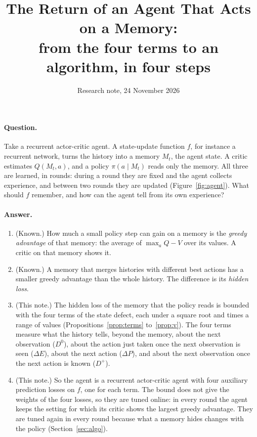 \documentclass[11pt]{article}
\title{The Return of an Agent That Acts on a Memory:\\ from the four terms to an algorithm, in four steps}
\author{}
\date{Research note, 24 November 2026}
\theoremstyle{definition}
\newcommand{\dE}{\Delta E}
\newcommand{\dP}{\Delta P}
\begin{document}
\maketitle

\paragraph{Question.} Take a recurrent actor-critic agent. A state-update function $f$, for instance a recurrent network, turns the history into a memory $M_t$, the agent state. A critic estimates $Q(M_t,a)$, and a policy $\pi(a\mid M_t)$ reads only the memory. All three are learned, in rounds: during a round they are fixed and the agent collects experience, and between two rounds they are updated (Figure~\ref{fig:agent}). What should $f$ remember, and how can the agent tell from its own experience?

\paragraph{Answer.}
\begin{enumerate}
\item (Known.) How much a small policy step can gain on a memory is the \emph{greedy advantage} of that memory: the average of $\max_aQ-V$ over its values. A critic on that memory shows it.
\item (Known.) A memory that merges histories with different best actions has a smaller greedy advantage than the whole history. The difference is its \emph{hidden loss}.
\item (This note.) The hidden loss of the memory that the policy reads is bounded with the four terms of the state defect, each under a square root and times a range of values (Propositions~\ref{prop:terms} to~\ref{prop:v}). The four terms measure what the history tells, beyond the memory, about the next observation ($D^0$), about the action just taken once the next observation is seen ($\dE$), about the next action ($\dP$), and about the next observation once the next action is known ($D^+$).
\item (This note.) So the agent is a recurrent actor-critic agent with four auxiliary prediction losses on $f$, one for each term. The bound does not give the weights of the four losses, so they are tuned online: in every round the agent keeps the setting for which its critic shows the largest greedy advantage. They are tuned again in every round because what a memory hides changes with the policy (Section~\ref{sec:algo}).
\end{enumerate}
\end{document}
